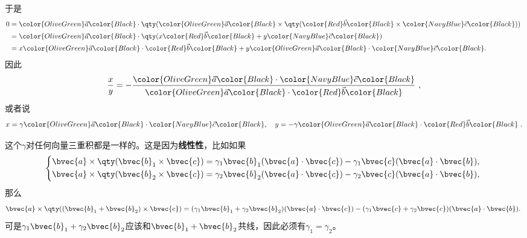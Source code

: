 于是
\begin{equation}
\begin{aligned}
0 ={}& \color{OliveGreen}\vec{a}\color{Black}\cdot\qty(\color{OliveGreen}\vec{a}\color{Black}\times\qty(\color{Red}\vec{b}\color{Black}\times\color{NavyBlue}\vec{c}\color{Black}))\\
={}& \color{OliveGreen}\vec{a}\color{Black}\cdot\qty(x\color{Red}\vec{b}\color{Black}+y\color{NavyBlue}\vec{c}\color{Black})\\
={}& x\color{OliveGreen}\vec{a}\color{Black}\cdot\color{Red}\vec{b}\color{Black}+y\color{OliveGreen}\vec{a}\color{Black}\cdot\color{NavyBlue}\vec{c}\color{Black}. 
\end{aligned}~
\end{equation}
因此
\begin{equation}
\frac{x}{y} = -\frac{\color{OliveGreen}\vec{a}\color{Black}\cdot\color{NavyBlue}\vec{c}\color{Black}}{\color{OliveGreen}\vec{a}\color{Black}\cdot\color{Red}\vec{b}\color{Black}}~, 
\end{equation}
或者说
\begin{equation}
x = \gamma\color{OliveGreen}\vec{a}\color{Black}\cdot\color{NavyBlue}\vec{c}\color{Black},\quad y=-\gamma \color{OliveGreen}\vec{a}\color{Black}\cdot\color{Red}\vec{b}\color{Black}~. 
\end{equation}

这个$\gamma$对任何向量三重积都是一样的。这是因为\textbf{线性性}，比如如果
\begin{equation}
\left\{
\begin{aligned}
\bvec{a}\times\qty(\bvec{b}_1\times\bvec{c}) ={}& \gamma_1\bvec{b}_1(\bvec{a}\cdot\bvec{c}) - \gamma_1\bvec{c}(\bvec{a}\cdot\bvec{b}), \\
\bvec{a}\times\qty(\bvec{b}_2\times\bvec{c}) ={}& \gamma_2\bvec{b}_2(\bvec{a}\cdot\bvec{c}) - \gamma_2\bvec{c}(\bvec{a}\cdot\bvec{b}), 
\end{aligned}
\right. ~
\end{equation}
那么
\begin{equation}
\bvec{a}\times\qty((\bvec{b}_1+\bvec{b}_2)\times\bvec{c}) = (\gamma_1\bvec{b}_1+\gamma_2\bvec{b}_2)(\bvec{a}\cdot\bvec{c}) - (\gamma_1\bvec{c}+\gamma_2\bvec{c})(\bvec{a}\cdot\bvec{b}). 
~\end{equation}
可是$\gamma_1\bvec{b}_1+\gamma_2\bvec{b}_2$应该和$\bvec{b}_1+\bvec{b}_2$共线，因此必须有$\gamma_1=\gamma_2$。

